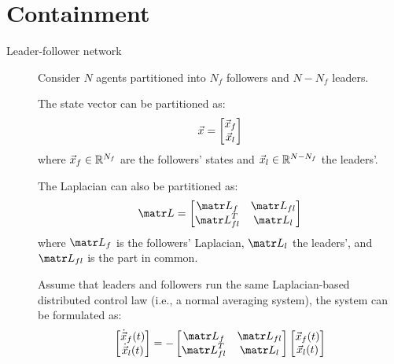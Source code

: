 \chapter{Containment}


\begin{description}
    \item[Leader-follower network] 
        Consider $N$ agents partitioned into $N_f$ followers and $N-N_f$ leaders.
        
        The state vector can be partitioned as:
        \[ {\vec{x}} = \begin{bmatrix} {\vec{x}}_f \\ {\vec{x}}_l \end{bmatrix} \]
        where ${\vec{x}}_f \in \mathbb{R}^{N_f}$ are the followers' states and ${\vec{x}}_l \in \mathbb{R}^{N-N_f}$ the leaders'.
        
        The Laplacian can also be partitioned as:
        \[
            \lap = \begin{bmatrix} \lap_f & \lap_{fl} \\ \lap_{fl}^T & \lap_l \end{bmatrix}
        \]
        where $\lap_f$ is the followers' Laplacian, $\lap_l$ the leaders', and $\lap_{fl}$ is the part in common.

        Assume that leaders and followers run the same Laplacian-based distributed control law (i.e., a normal averaging system), the system can be formulated as:
        \[
            \begin{bmatrix} \dot{\x}_f(t) \\ \dot{\x}_l(t) \end{bmatrix} =
            - \begin{bmatrix} \lap_f & \lap_{fl} \\ \lap_{fl}^T & \lap_l \end{bmatrix}
            \begin{bmatrix} \x_f(t) \\ \x_l(t) \end{bmatrix}
        \]


\end{description}
